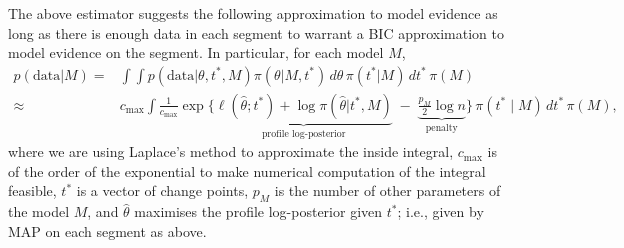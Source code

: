 \documentclass{article}
\theoremstyle{plain}
\theoremstyle{definition}
\newcommand{\1}{\mathbf{1}}
\begin{document}
The above estimator suggests the following approximation to model evidence as long as there is enough data in each segment to warrant a BIC approximation to model evidence on the segment. In particular, for each model $M$,
\begin{align}\label{eq:int_evidence} p(\mathrm{data}|M)=&\int \int p(\mathrm{data}|\theta,t^\ast,M)\pi(\theta|M,t^\ast)\,d\theta \,\pi(t^\ast|M)\,dt^\ast\,\pi(M)\\
\approx &c_{\mathrm{max}}\int \frac1{c_\mathrm{max}}\exp\Big\{
\underbrace{\ell(\widehat\theta;t^\ast)+\log\pi(\widehat\theta|t^\ast,M)}_{\text{profile log-posterior}}
\;-\;\underbrace{\tfrac{p_M}{2}\log n}_{\text{penalty}}
\Big\}\,
\pi(t^\ast\mid M)\,dt^\ast\,\pi(M),
\end{align}
where we are using Laplace's method to approximate the inside integral, $c_{\mathrm {max}}$ is of the order of the exponential to make numerical computation of the integral feasible, $t^\ast$ is a vector of change points, $p_M$ is the number of other parameters of the model $M$, and $\widehat \theta$ maximises the profile log-posterior given $t^\ast$; i.e., given by MAP on each segment as above. 

\end{document}
